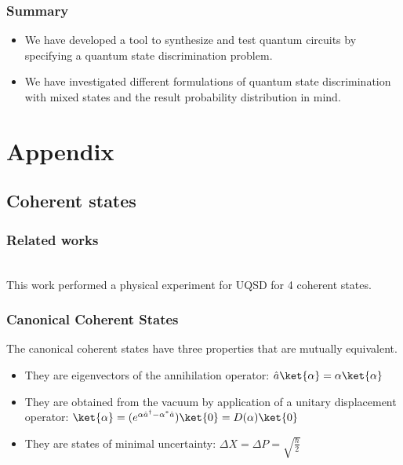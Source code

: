 \documentclass{beamer}
\begin{document}
\begin{frame}
    \frametitle{Summary}
    \begin{itemize}
        \item We have developed a tool to synthesize and test quantum circuits
              by specifying a quantum state discrimination problem.
        \item We have investigated different formulations of quantum state
              discrimination with mixed states and the result probability
              distribution in mind.
    \end{itemize}
\end{frame}

\section{Appendix}

\subsection{Coherent states}

\begin{frame}
    \frametitle{Related works}
    \cite{RN382}\\
    This work performed a physical experiment for UQSD for 4 coherent states.

\end{frame}

\begin{frame}
    \frametitle{Canonical Coherent States}
    The canonical coherent states have three properties that are mutually equivalent.
    \begin{itemize}
        \item They are eigenvectors of the annihilation operator: $\hat{a}\ket{\alpha}=\alpha\ket{\alpha}$
        \item They are obtained from the vacuum by application of a unitary displacement operator:
              $\ket{\alpha}=(e^{\alpha \hat{a}^{\dagger} - \alpha^{*}\hat{a}})\ket{0}=D(\alpha)\ket{0}$
        \item They are states of minimal uncertainty: $\Delta{X} = \Delta{P} = \sqrt{\frac{\hbar}{2}}$
    \end{itemize}
\end{frame}
\end{document}
